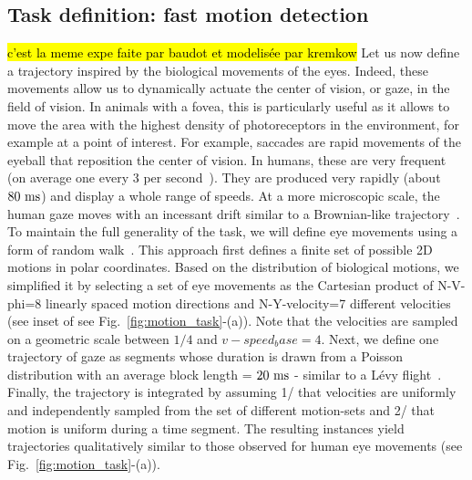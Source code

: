 \documentclass[default]{sn-jnl}%
\theoremstyle{thmstyleone}%
\theoremstyle{thmstyletwo}%
\theoremstyle{thmstylethree}%
\newcommand{\seeFig}[1]{see Fig.~\ref{fig:#1}}%
\newcommand{\note}[1]{{\sethlcolor{yellow}\hl{#1}}}
\begin{document}
\subsection{Task definition: fast motion detection}
\note{c'est la meme expe faite par baudot et modelisée par kremkow}
Let us now define a trajectory inspired by the biological movements of the eyes. Indeed, these movements allow us to dynamically actuate the center of vision, or gaze, in the field of vision. In animals with a fovea, this is particularly useful as it allows to move the area with the highest density of photoreceptors in the environment, for example at a point of interest. For example, saccades are rapid movements of the eyeball that reposition the center of vision. In humans, these are very frequent (on average one every 3 per second~\citep{dandekar_neural_2012}). They are produced very rapidly (about $80~\si{\milli\second}$) and display a whole range of speeds. At a more microscopic scale, the human gaze moves with an incessant drift similar to a Brownian-like trajectory~\citep{poletti_head-eye_2015}. To maintain the full generality of the task, we will define eye movements using a form of random walk~\citep{engbert_integrated_2011}. This approach first defines a finite set of possible 2D motions in polar coordinates. Based on the distribution of biological motions, we simplified it by selecting a set of eye movements as the Cartesian product of N-V-phi=8 linearly spaced motion directions and N-Y-velocity=7 different velocities (see inset of \seeFig{motion_task}-(a)). Note that the velocities are sampled on a geometric scale between $1/4$ and $v-speed_base = 4$. Next, we define one trajectory of gaze as segments whose duration is drawn from a Poisson distribution with an average block length = $20~\si{\milli\second}$ - similar to a Lévy flight~\citep[p. 289]{mandelbrot_fractal_1982}. Finally, the trajectory is integrated by assuming 1/ that velocities are uniformly and independently sampled from the set of different motion-sets and 2/ that motion is uniform during a time segment. The resulting instances yield trajectories qualitatively similar to those observed for human eye movements (\seeFig{motion_task}-(a)).
\end{document}
